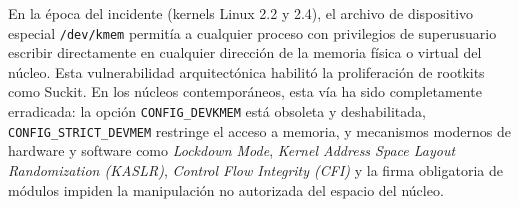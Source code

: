 \begin{perspectiva20}
En la época del incidente (kernels Linux 2.2 y 2.4), el archivo de dispositivo especial \texttt{/dev/kmem} permitía a cualquier proceso con privilegios de superusuario escribir directamente en cualquier dirección de la memoria física o virtual del núcleo. Esta vulnerabilidad arquitectónica habilitó la proliferación de rootkits como Suckit. En los núcleos contemporáneos, esta vía ha sido completamente erradicada: la opción \texttt{CONFIG\_DEVKMEM} está obsoleta y deshabilitada, \texttt{CONFIG\_STRICT\_DEVMEM} restringe el acceso a memoria, y mecanismos modernos de hardware y software como \textit{Lockdown Mode}, \textit{Kernel Address Space Layout Randomization (KASLR)}, \textit{Control Flow Integrity (CFI)} y la firma obligatoria de módulos impiden la manipulación no autorizada del espacio del núcleo.
\end{perspectiva20}

